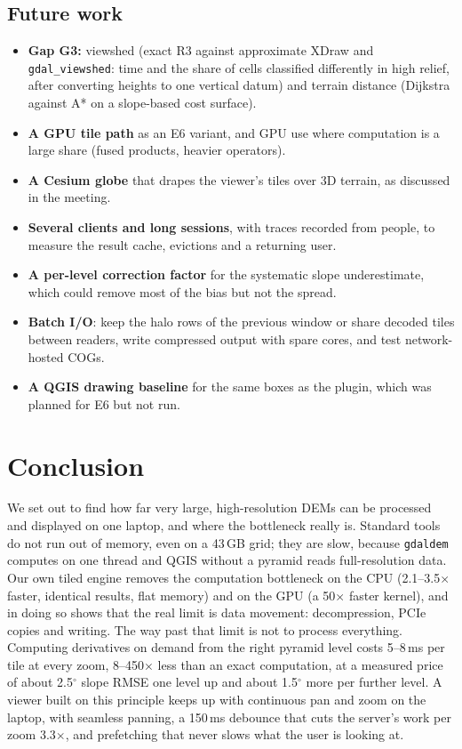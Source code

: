 \documentclass[11pt,a4paper]{article}
\begin{document}
\subsection{Future work}
\begin{itemize}
  \item \textbf{Gap G3:} viewshed (exact R3 against approximate XDraw and \texttt{gdal\_viewshed}: time and the share
  of cells classified differently in high relief, after converting heights to one vertical datum) and terrain
  distance (Dijkstra against A* on a slope-based cost surface).
  \item \textbf{A GPU tile path} as an E6 variant, and GPU use where computation is a large share (fused products,
  heavier operators).
  \item \textbf{A Cesium globe} that drapes the viewer's tiles over 3D terrain, as discussed in the meeting.
  \item \textbf{Several clients and long sessions}, with traces recorded from people, to measure the result cache,
  evictions and a returning user.
  \item \textbf{A per-level correction factor} for the systematic slope underestimate, which could remove most of
  the bias but not the spread.
  \item \textbf{Batch I/O}: keep the halo rows of the previous window or share decoded tiles between readers, write
  compressed output with spare cores, and test network-hosted COGs.
  \item \textbf{A QGIS drawing baseline} for the same boxes as the plugin, which was planned for E6 but not run.
\end{itemize}

\section{Conclusion}\label{sec:conclusion}
We set out to find how far very large, high-resolution DEMs can be processed and displayed on one laptop, and where
the bottleneck really is. Standard tools do not run out of memory, even on a 43\,GB grid; they are slow, because
\texttt{gdaldem} computes on one thread and QGIS without a pyramid reads full-resolution data. Our own tiled engine
removes the computation bottleneck on the CPU (2.1--3.5$\times$ faster, identical results, flat memory) and on the
GPU (a 50$\times$ faster kernel), and in doing so shows that the real limit is data movement: decompression, PCIe
copies and writing. The way past that limit is not to process everything. Computing derivatives on demand from the
right pyramid level costs 5--8\,ms per tile at every zoom, 8--450$\times$ less than an exact computation, at a
measured price of about 2.5$^\circ$ slope RMSE one level up and about 1.5$^\circ$ more per further level. A viewer built
on this principle keeps up with continuous pan and zoom on the laptop, with seamless panning, a 150\,ms debounce
that cuts the server's work per zoom 3.3$\times$, and prefetching that never slows what the user is looking at.
\end{document}

